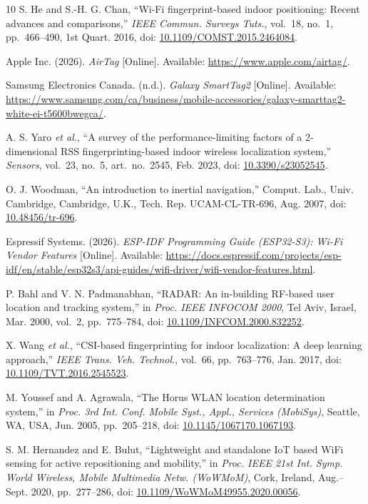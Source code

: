 \documentclass[12pt,letterpaper]{article}
\begin{document}
\begin{thebibliography}{10}
S. He and S.-H. G. Chan, ``Wi-Fi fingerprint-based indoor positioning: Recent advances and
comparisons,'' \emph{IEEE Commun. Surveys Tuts.}, vol.~18, no.~1, pp.~466--490, 1st Quart. 2016,
doi: \url{10.1109/COMST.2015.2464084}.

Apple Inc. (2026). \emph{AirTag} [Online]. Available: \url{https://www.apple.com/airtag/}.

Samsung Electronics Canada. (n.d.). \emph{Galaxy SmartTag2} [Online]. Available:
\url{https://www.samsung.com/ca/business/mobile-accessories/galaxy-smarttag2-white-ei-t5600bwegca/}.

A. S. Yaro \emph{et al.}, ``A survey of the performance-limiting factors of a
2-dimensional RSS fingerprinting-based indoor wireless localization system,'' \emph{Sensors},
vol.~23, no.~5, art.~no.~2545, Feb. 2023, doi: \url{10.3390/s23052545}.

O. J. Woodman, ``An introduction to inertial navigation,'' Comput. Lab., Univ. Cambridge,
Cambridge, U.K., Tech. Rep. UCAM-CL-TR-696, Aug. 2007, doi: \url{10.48456/tr-696}.

Espressif Systems. (2026). \emph{ESP-IDF Programming Guide (ESP32-S3): Wi-Fi Vendor Features}
[Online]. Available:
\url{https://docs.espressif.com/projects/esp-idf/en/stable/esp32s3/api-guides/wifi-driver/wifi-vendor-features.html}.

P. Bahl and V. N. Padmanabhan, ``RADAR: An in-building RF-based user location and tracking
system,'' in \emph{Proc. IEEE INFOCOM 2000}, Tel Aviv, Israel, Mar. 2000, vol.~2, pp.~775--784,
doi: \url{10.1109/INFCOM.2000.832252}.

X. Wang \emph{et al.}, ``CSI-based fingerprinting for indoor localization: A deep learning
approach,'' \emph{IEEE Trans. Veh. Technol.}, vol.~66, pp.~763--776, Jan. 2017,
doi: \url{10.1109/TVT.2016.2545523}.

M. Youssef and A. Agrawala, ``The Horus WLAN location determination system,'' in \emph{Proc. 3rd
Int. Conf. Mobile Syst., Appl., Services (MobiSys)}, Seattle, WA, USA, Jun. 2005, pp.~205--218,
doi: \url{10.1145/1067170.1067193}.

S. M. Hernandez and E. Bulut, ``Lightweight and standalone IoT based WiFi sensing for active
repositioning and mobility,'' in \emph{Proc. IEEE 21st Int. Symp. World Wireless, Mobile Multimedia
Netw. (WoWMoM)}, Cork, Ireland, Aug.--Sept. 2020, pp.~277--286,
doi: \url{10.1109/WoWMoM49955.2020.00056}.


\end{thebibliography}
\end{document}
